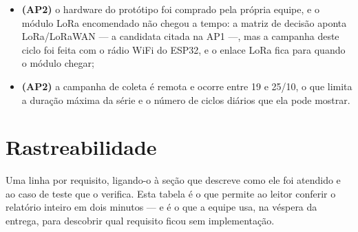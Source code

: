 \begin{itemize}
    WiFi do próprio estabelecimento, de terceiros: instalar exige as
    credenciais e a permissão dos proprietários, que a equipe ainda não
    tem, e uma rede com portal de acesso (\emph{captive portal})
    impediria o ESP32 de se associar sem código adicional; no produto, só
    o nó central depende dessa rede;
  \item \textbf{(AP2)} o hardware do protótipo foi comprado pela própria
    equipe, e o módulo LoRa encomendado não chegou a tempo: a matriz de
    decisão aponta LoRa/LoRaWAN --- a candidata citada na AP1 ---, mas a
    campanha deste ciclo foi feita com o rádio WiFi do ESP32, e o enlace
    LoRa fica para quando o módulo chegar;
  \item \textbf{(AP2)} a campanha de coleta é remota e ocorre entre 19 e
    25/10, o que limita a duração máxima da série e o número de ciclos
    diários que ela pode mostrar.
\end{itemize}

\section{Rastreabilidade}
\label{sec:rastreabilidade}

\begin{orientacao}
Uma linha por requisito, ligando-o à seção que descreve como ele foi
atendido e ao caso de teste que o verifica. Esta tabela é o que permite
ao leitor conferir o relatório inteiro em dois minutos --- e é o que a
equipe usa, na véspera da entrega, para descobrir qual requisito ficou
sem implementação.
\end{orientacao}


